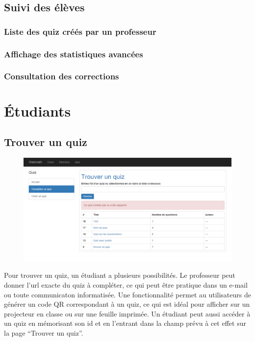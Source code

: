 \documentclass[a4,10pt,french]{sphinxmanual}
\begin{document}
\subsection{Suivi des élèves}
\label{doc-user:suivi-des-eleves}

\subsubsection{Liste des quiz créés par un professeur}
\label{doc-user:liste-des-quiz-crees-par-un-professeur}

\subsubsection{Affichage des statistiques avancées}
\label{doc-user:affichage-des-statistiques-avancees}

\subsubsection{Consultation des corrections}
\label{doc-user:consultation-des-corrections}

\section{Étudiants}
\label{doc-user:etudiants}

\subsection{Trouver un quiz}
\label{doc-user:trouver-un-quiz}\begin{figure}[htbp]
\centering

\includegraphics{find.png}
\end{figure}

Pour trouver un quiz, un étudiant a plusieurs possibilités. Le professeur peut donner l'url exacte du quiz à compléter, ce qui peut être pratique dans un e-mail ou toute communicaton informatisée. Une fonctionnalité permet au utilisateurs de générer un code QR correspondant à un quiz, ce qui est idéal pour afficher sur un projecteur en classe ou sur une feuille imprimée. Un étudiant peut aussi accéder à un quiz en mémorisant son id et en l'entrant dans la champ prévu à cet effet sur la page ``Trouver un quiz''.
\end{document}
